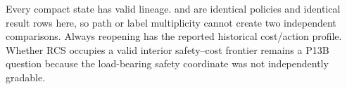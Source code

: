 {}Every compact state has valid lineage.  and  are identical policies and identical result rows here, so path or label multiplicity cannot create two independent comparisons.\markdownRendererInterblockSeparator
{}
\markdownRendererSectionEnd \markdownRendererSectionBegin
{}\markdownRendererInterblockSeparator
{}Always reopening has the reported historical cost/action profile. Whether RCS occupies a valid interior safety–cost frontier remains a P13B question because the load-bearing safety coordinate was not independently gradable.
\markdownRendererSectionEnd 
\markdownRendererSectionEnd \markdownRendererDocumentEnd